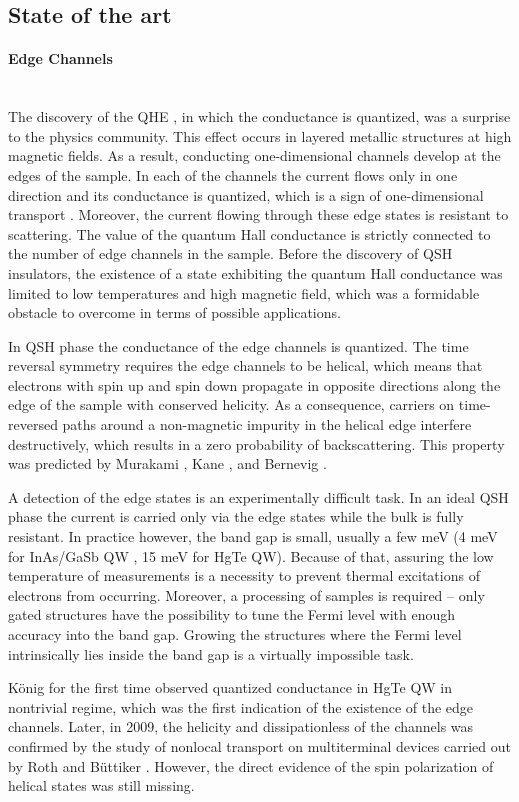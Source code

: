 \documentclass[titlepage,a4paper]{book}
\newcommand{\wciecie}{\quad\phantom{v}}
\newcommand{\myparagraph}[1]{\paragraph{#1}\mbox{}\\}
\begin{document}
\subsection{State of the art}
\myparagraph{Edge Channels}
\wciecie
The discovery of the QHE \cite{Klitzing_Topology}, in which the conductance is quantized, was a surprise to the physics community. This effect occurs in layered metallic structures at high magnetic fields. As a result, conducting one-dimensional channels develop at the edges of the sample. In each of the channels the current flows only in one direction and its conductance is quantized, which is a sign of one-dimensional transport \cite{Halperin_State}. Moreover, the current flowing through these edge states is resistant to scattering. The value of the quantum Hall conductance is strictly connected to the number of edge channels in the sample. Before the discovery of QSH insulators, the existence of a state exhibiting the quantum Hall conductance was limited to low temperatures and high magnetic field, which was a formidable obstacle to overcome in terms of possible applications.
   
In QSH phase the conductance of the edge channels is quantized. The time reversal symmetry requires the edge channels to be helical, which means that electrons with spin up and spin down propagate in opposite directions along the edge of the sample with conserved helicity. As a consequence, carriers on time-reversed paths around a non-magnetic impurity in the helical edge interfere destructively, which results in a zero probability of backscattering. This property was predicted by Murakami \cite{Murakami_State}, Kane \cite{Kane_Topology}, and Bernevig \cite{Bernevig_Topology1}. 

A detection of the edge states is an experimentally difficult task. In an ideal QSH phase the current is carried only via the edge states while the bulk is fully resistant. In practice however, the band gap is small, usually a few meV (4 meV for InAs/GaSb QW \cite{Altarelli_BandStructure}\cite{Yang_BandStructure}, 15 meV for HgTe QW). Because of that, assuring the low temperature of measurements is a necessity to prevent thermal excitations of electrons from occurring. Moreover, a processing of samples is required -- only gated structures have the possibility to tune the Fermi level with enough accuracy into the band gap. Growing the structures where the Fermi level intrinsically lies inside the band gap is a virtually impossible task.

König \cite{Konig_Topology} for the first time observed quantized conductance in HgTe QW in nontrivial regime, which was the first indication of the existence of the edge channels. Later, in 2009, the helicity and dissipationless of the channels was confirmed by the study of nonlocal transport on multiterminal devices carried out by Roth \cite{Roth_State} and Büttiker \cite{Buttiker_State}. However, the direct evidence of the spin polarization of helical states was still missing. 
\end{document}
